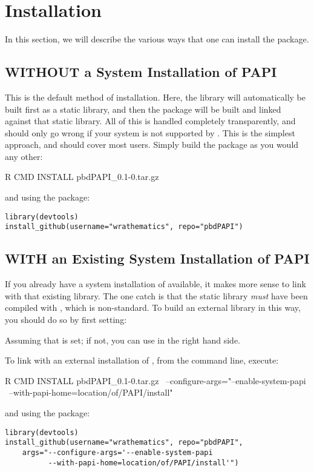 \section{Installation}
\label{sec:installation}

In this section, we will describe the various ways that one can install the \thispackage package.



\subsection{WITHOUT a System Installation of PAPI}

This is the default method of installation.  Here, the \PAPI library will automatically be built first as a static library, and then the \thispackage package will be built and linked against that static library.  All of this is handled completely transparently, and should only go wrong if your system is not supported by \PAPI.  This is the simplest approach, and should cover most users.  Simply build the package as you would any other:
\begin{Command}
R CMD INSTALL pbdPAPI_0.1-0.tar.gz
\end{Command}
and using the  package:
\begin{lstlisting}
library(devtools)
install_github(username="wrathematics", repo="pbdPAPI")
\end{lstlisting}




\subsection{WITH an Existing System Installation of PAPI}

If you already have a system installation of \PAPI available, it makes more sense to link with that existing library.  The one catch is that the static library \emph{must} have been compiled with , which is non-standard.  To build an external \PAPI library in this way, you should do so by first setting:
Assuming that  is set; if not, you can use  in the right hand side.

To link with an external installation of \PAPI, from the command line, execute:
\begin{Command}
R CMD INSTALL pbdPAPI_0.1-0.tar.gz \ 
    --configure-args="--enable-system-papi \ 
    --with-papi-home=location/of/PAPI/install"
\end{Command}
and using the  package:
\begin{lstlisting}
library(devtools)
install_github(username="wrathematics", repo="pbdPAPI", 
    args="--configure-args='--enable-system-papi 
          --with-papi-home=location/of/PAPI/install'")
\end{lstlisting}
